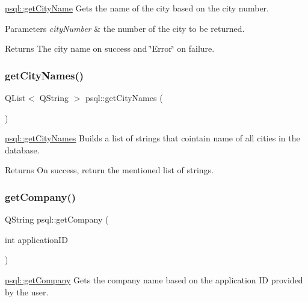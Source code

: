 \mbox{\hyperlink{classpsql_a7acc18034ef60c8a1e69b0e1a15d8ab2}{psql\+::get\+City\+Name}} Gets the name of the city based on the city number. 


\begin{DoxyParams}{Parameters}
{\em city\+Number} & the number of the city to be returned. \\
\hline
\end{DoxyParams}
\begin{DoxyReturn}{Returns}
The city name on success and \char`\"{}\+Error\char`\"{} on failure. 
\end{DoxyReturn}
\mbox{\label{classpsql_a42ee0cf90055ba6a7a6f564cf04d8bb8}} 
\subsubsection{\texorpdfstring{get\+City\+Names()}{getCityNames()}}
{\footnotesize\ttfamily Q\+List$<$ Q\+String $>$ psql\+::get\+City\+Names (\begin{DoxyParamCaption}{ }\end{DoxyParamCaption})}



\mbox{\hyperlink{classpsql_a42ee0cf90055ba6a7a6f564cf04d8bb8}{psql\+::get\+City\+Names}} Builds a list of strings that cointain name of all cities in the database. 

\begin{DoxyReturn}{Returns}
On success, return the mentioned list of strings. 
\end{DoxyReturn}
\mbox{\label{classpsql_a09745cd03f09ffb2dacacaab4281915f}} 
\subsubsection{\texorpdfstring{get\+Company()}{getCompany()}}
{\footnotesize\ttfamily Q\+String psql\+::get\+Company (\begin{DoxyParamCaption}\item[{int}]{application\+ID }\end{DoxyParamCaption})}



\mbox{\hyperlink{classpsql_a09745cd03f09ffb2dacacaab4281915f}{psql\+::get\+Company}} Gets the company name based on the application ID provided by the user. 


